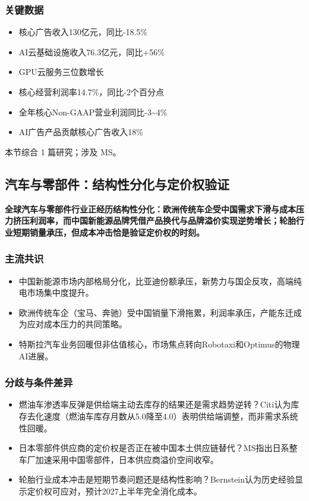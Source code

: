 \documentclass[11pt]{ctexart}
\begin{document}
\subsubsection*{关键数据}
\begin{itemize}
  \item 核心广告收入130亿元，同比-18.5\%
  \item AI云基础设施收入76.3亿元，同比+56\%
  \item GPU云服务三位数增长
  \item 核心经营利润率14.7\%，同比-2个百分点
  \item 全年核心Non-GAAP营业利润同比-3\textasciitilde{}4\%
  \item AI广告产品贡献核心广告收入18\%
\end{itemize}
{\small\color{refgray}本节综合 1 篇研究；涉及 MS。}
\newpage
\subsection{汽车与零部件：结构性分化与定价权验证}
\textbf{全球汽车与零部件行业正经历结构性分化：欧洲传统车企受中国需求下滑与成本压力挤压利润率，而中国新能源品牌凭借产品换代与品牌溢价实现逆势增长；轮胎行业短期销量承压，但成本冲击恰是验证定价权的时刻。}
\subsubsection*{主流共识}
\begin{itemize}
  \item 中国新能源市场内部格局分化，比亚迪份额承压，新势力与国企反攻，高端纯电市场集中度提升。
  \item 欧洲传统车企（宝马、奔驰）受中国销量下滑拖累，利润率承压，产能东迁成为应对成本压力的共同策略。
  \item 特斯拉汽车业务回暖但非估值核心，市场焦点转向Robotaxi和Optimus的物理AI进展。
\end{itemize}
\subsubsection*{分歧与条件差异}
\begin{itemize}
  \item 燃油车渗透率反弹是供给端主动去库存的结果还是需求趋势逆转？Citi认为库存去化速度（燃油车库存月数从5.0降至4.0）表明供给端调整，而非需求系统性回暖。
  \item 日本零部件供应商的定价权是否正在被中国本土供应链替代？MS指出日系整车厂加速采用中国零部件，日本供应商溢价空间收窄。
  \item 轮胎行业成本冲击是短期节奏问题还是结构性影响？Bernstein认为历史经验显示定价权可应对，预计2027上半年完全消化成本。
\end{itemize}
\end{document}
